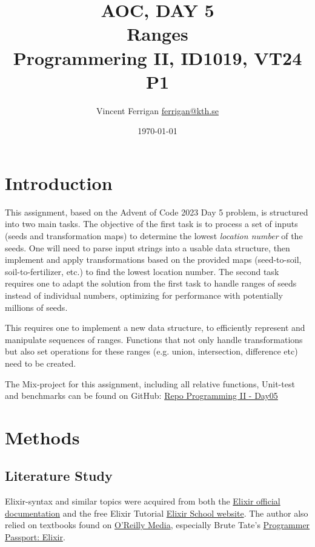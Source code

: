 \documentclass[a4paper,11pt]{article}
\begin{document}
\title{
    AOC, DAY 5
    \\Ranges
\\\small{Programmering II, ID1019, VT24 P1}
}
\author{Vincent Ferrigan \href{mailto:ferrigan@kth.se}{ferrigan@kth.se}}

\date{\today}

\maketitle

\section*{Introduction}
\label{sec:introduction}
This assignment, based on the Advent of Code 2023 Day 5 problem, is structured into two main tasks.
The objective of the first task is to process a set of inputs (seeds and transformation maps)
to determine the lowest \emph{location number} of the seeds.
One will need to parse input strings into a usable data structure,
then implement and apply transformations based on the provided maps
(seed-to-soil, soil-to-fertilizer, etc.) to find the lowest location number.
The second task requires one to
adapt the solution from the first task to handle ranges of seeds instead of individual numbers,
optimizing for performance with potentially millions of seeds.

This requires one to
implement a new data structure, to efficiently represent and manipulate sequences of ranges.
Functions that not only handle transformations but also set operations for these ranges
(e.g. union, intersection, difference etc) need to be created.

The Mix-project for this assignment, including all relative functions, Unit-test and benchmarks can be found on GitHub:
\href{https://github.com/VincentFerrigan/kth-id1019-programming-ii/tree/main/tasks/6/day05}{Repo Programming II - Day05}%

\section*{Methods}\label{sec:methods}
\subsection*{Literature Study}
\label{subsec:literaturestudy}
Elixir-syntax and similar topics were acquired
from both the
\href{https://elixir-lang.org/docs.html}{Elixir official documentation}
and the free Elixir Tutorial
\href{https://elixirschool.com/en}{Elixir School
website}.
The author also relied on textbooks found on
\href{https://learning.oreilly.com}{O'Reilly Media},
especially Brute Tate's
\href{https://learning.oreilly.com/library/view/programmer-passport-elixir/9781680509649/}{Programmer Passport: Elixir}.
\end{document}
